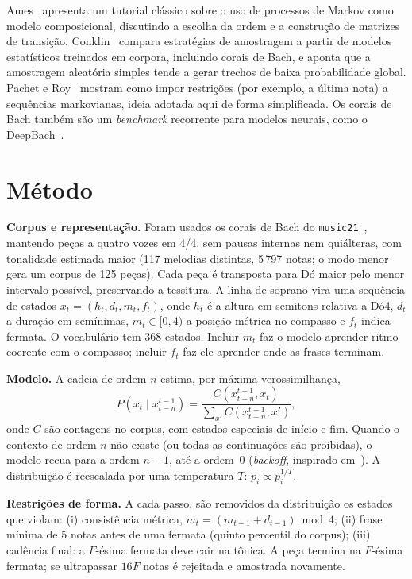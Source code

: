 \documentclass{article}
\begin{document}
Ames~\cite{ames1989} apresenta um tutorial clássico sobre o uso de processos de Markov como modelo composicional, discutindo a escolha da ordem e a construção de matrizes de transição. Conklin~\cite{conklin2003} compara estratégias de amostragem a partir de modelos estatísticos treinados em corpora, incluindo corais de Bach, e aponta que a amostragem aleatória simples tende a gerar trechos de baixa probabilidade global. Pachet e Roy~\cite{pachet2011} mostram como impor restrições (por exemplo, a última nota) a sequências markovianas, ideia adotada aqui de forma simplificada. Os corais de Bach também são um \emph{benchmark} recorrente para modelos neurais, como o DeepBach~\cite{hadjeres2017}.

\section{Método}\label{sec:metodo}

\textbf{Corpus e representação.} Foram usados os corais de Bach do \texttt{music21}~\cite{cuthbert2010}, mantendo peças a quatro vozes em 4/4, sem pausas internas nem quiálteras, com tonalidade estimada maior (117 melodias distintas, 5\,797 notas; o modo menor gera um corpus de 125 peças). Cada peça é transposta para Dó maior pelo menor intervalo possível, preservando a tessitura. A linha de soprano vira uma sequência de estados
$x_t = (h_t, d_t, m_t, f_t)$, onde $h_t$ é a altura em semitons relativa a Dó4, $d_t$ a duração em semínimas, $m_t \in [0,4)$ a posição métrica no compasso e $f_t$ indica fermata. O vocabulário tem 368 estados. Incluir $m_t$ faz o modelo aprender ritmo coerente com o compasso; incluir $f_t$ faz ele aprender onde as frases terminam.

\textbf{Modelo.} A cadeia de ordem $n$ estima, por máxima verossimilhança,
\begin{equation}
P(x_t \mid x_{t-n}^{t-1}) = \frac{C(x_{t-n}^{t-1}, x_t)}{\sum_{x'} C(x_{t-n}^{t-1}, x')},
\end{equation}
onde $C$ são contagens no corpus, com estados especiais de início e fim. Quando o contexto de ordem $n$ não existe (ou todas as continuações são proibidas), o modelo recua para a ordem $n-1$, até a ordem~0 (\emph{backoff}, inspirado em~\cite{katz1987}). A distribuição é reescalada por uma temperatura $T$: $p_i \propto p_i^{1/T}$.

\textbf{Restrições de forma.} A cada passo, são removidos da distribuição os estados que violam: (i) consistência métrica, $m_t = (m_{t-1} + d_{t-1}) \bmod 4$; (ii) frase mínima de 5 notas antes de uma fermata (quinto percentil do corpus); (iii) cadência final: a $F$-ésima fermata deve cair na tônica. A peça termina na $F$-ésima fermata; se ultrapassar $16F$ notas é rejeitada e amostrada novamente.
\end{document}
